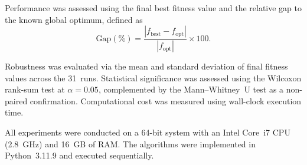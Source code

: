Performance was assessed using the final best fitness value and the relative gap to the known global optimum, defined as
\begin{equation}
    \text{Gap}(\%) =
    \frac{\left| f_{\text{best}} - f_{\text{opt}} \right|}
    {\left| f_{\text{opt}} \right|} \times 100.
    \label{eq:gap_metric}
\end{equation}

Robustness was evaluated via the mean and standard deviation of final fitness values across the 31~runs. Statistical significance was assessed using the Wilcoxon rank-sum test at $\alpha = 0.05$, complemented by the Mann--Whitney~U test as a non-paired confirmation. Computational cost was measured using wall-clock execution time.

All experiments were conducted on a 64-bit system with an Intel Core~i7 CPU (2.8~GHz) and 16~GB of RAM. The algorithms were implemented in Python~3.11.9 and executed sequentially.
